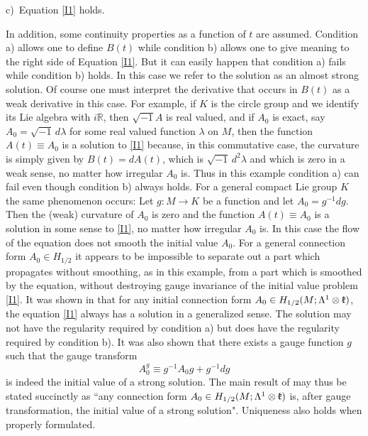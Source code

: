 \documentclass[12pt]{article}
\def \L{\Lambda}
\def \R{\mathbb R}
\def \kf{\frak k}
\def \beq{\begin{equation}}
\def \eeq{\end{equation}}
\def \eref{\eqref}
\numberwithin{equation}{section}
\begin{document}
c)\  Equation \eref{I1} holds.

\noindent
In addition, some continuity properties as a function of $t$ are assumed.
Condition a) allows one to define $B(t)$ while condition b) allows one to give
 meaning to the right side of Equation \eref{I1}. But it can easily happen that condition a) fails while
 condition b) holds. In this case we refer to the solution as an almost strong solution.
 Of course one must interpret the derivative that occurs in $B(t)$ 
 as a weak derivative in this case. 
           For example, if $K$ is  the circle group and  we  identify its Lie algebra with $i\R$, then 
 $\sqrt{-1}A$ is real valued, and if $A_0$ is exact, say $A_0 = \sqrt{-1}\, d\lambda$ for some real
 valued function $\lambda$ on $M$, 
 then the function $A(t) \equiv A_0$ is a solution to \eref{I1} because, in this commutative case,
 the curvature is simply given by $B(t) = dA(t)$, which is $\sqrt{-1}\, d^2 \lambda$ and which is zero
 in a weak sense, no matter how irregular $A_0$ is. Thus in this example condition a) can fail even though
 condition b) always holds.
           For a general compact Lie group $K$ the same phenomenon occurs:
 Let $g:M\rightarrow K$  
 be a function and let $A_0 = g^{-1} dg$. Then the (weak) curvature
 of $A_0$ is zero and the function $A(t) \equiv A_0$ is a solution in some sense to \eref{I1},
 no matter how irregular $A_0$ is.  In this case the flow of the equation does not smooth
 the  initial value $A_0$.  For a general connection form $A_0 \in H_{1/2}$ it appears to be  impossible
 to separate out a part which propagates without smoothing, as in this example,
 from a part  which is smoothed by the equation, without destroying gauge invariance 
 of the initial value problem \eref{I1}.
It was shown in
\cite{G70} that for any initial connection form $A_0 \in H_{1/2}(M;\L^1\otimes \kf)$,
 the equation \eref{I1} always has a solution in a generalized sense. The solution 
  may not have the regularity required by condition a) but does have the regularity required by condition b).
  It was also shown that there exists a gauge function $g$ such that the gauge transform 
\beq
 A_0^g \equiv g^{-1} A_0 g + g^{-1} dg                                    \label{I2}
 \eeq
  is indeed the initial value of a strong solution.
   The main result
 of \cite{G70} may thus be stated succinctly as ``any connection form 
 $A_0 \in H_{1/2}(M; \L^1\otimes \kf)$ is, after gauge transformation, the initial value
  of a strong solution".  Uniqueness also holds when properly formulated.
  
\end{document}
